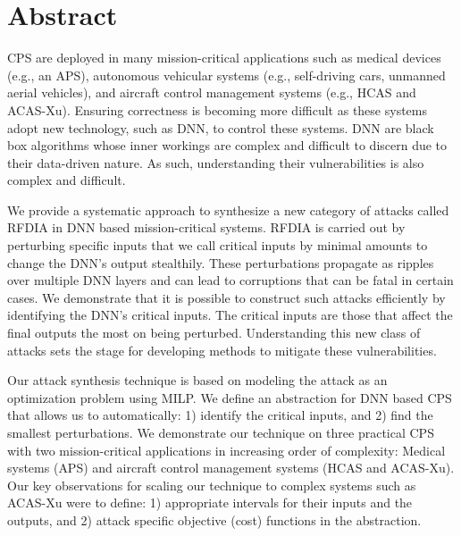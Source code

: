 
\chapter{Abstract}

\ac{CPS} are deployed in many mission-critical applications such as medical devices (e.g., an \ac{APS}), autonomous vehicular systems (e.g., self-driving cars, unmanned aerial vehicles), and aircraft control management systems (e.g.,  \ac{HCAS} and \ac{ACAS-Xu}). 
Ensuring correctness is becoming more difficult as these systems adopt new technology, such as \ac{DNN}, to control these systems. 
\ac{DNN} are black box algorithms whose inner workings are complex and difficult to discern due to their data-driven nature.
As such, understanding their vulnerabilities is also complex and difficult. 


We provide a systematic approach to synthesize a new category of attacks called \ac{RFDIA} in \ac{DNN} based mission-critical systems.
\ac{RFDIA} is carried out by perturbing specific inputs that we call critical inputs by minimal amounts to  change the \ac{DNN}'s output stealthily. These  perturbations propagate as ripples over multiple \ac{DNN} layers and can lead to corruptions that  can be fatal in certain cases. 
We demonstrate that it is possible  to construct such attacks efficiently by identifying the \ac{DNN}'s critical inputs. 
The critical inputs are those that  affect the final outputs the most on being perturbed. 
Understanding this new class of attacks sets the stage for developing methods to mitigate these vulnerabilities. 

Our attack synthesis technique is based on modeling the attack as an optimization problem using \ac{MILP}.
We define an abstraction for \ac{DNN} based \ac{CPS} that allows us to automatically: 1) identify the critical inputs, and 2) find the smallest perturbations. 
We demonstrate our technique on three practical \ac{CPS} with two mission-critical applications in increasing order of complexity: Medical systems (\ac{APS}) and aircraft control management systems (\ac{HCAS} and \ac{ACAS-Xu}). 
Our key observations for scaling our technique to complex systems such as \ac{ACAS-Xu} were to define: 1) appropriate intervals for their inputs and the outputs, and 2) attack specific objective (cost) functions in the abstraction.  
 




